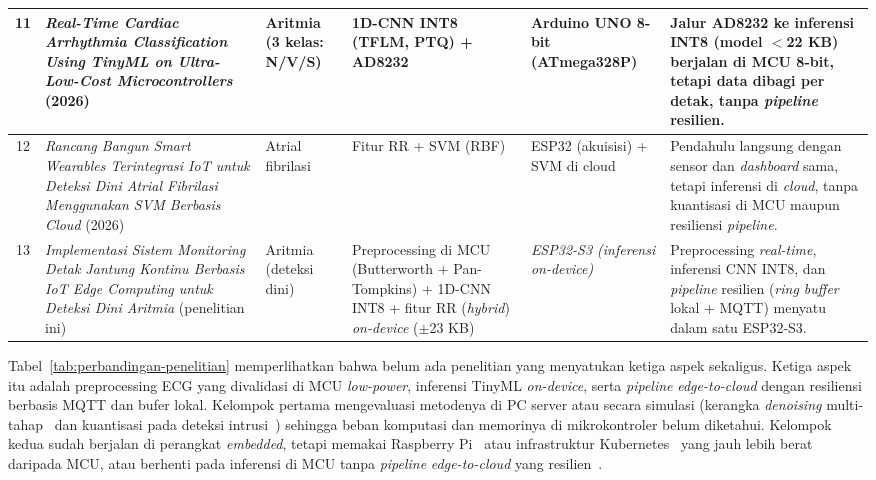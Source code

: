 {\begin{longtable}{|c|L{3.5cm}|L{2.0cm}|L{2.0cm}|L{1.8cm}|L{2.8cm}|}
11 & \textit{Real-Time Cardiac Arrhythmia Classification Using TinyML on Ultra-Low-Cost Microcontrollers} (2026) & Aritmia (3 kelas: N/V/S) & 1D-CNN INT8 (TFLM, PTQ) + AD8232 & Arduino UNO 8-bit (ATmega328P) & Jalur AD8232 ke inferensi INT8 (model $<$22 KB) berjalan di MCU 8-bit, tetapi data dibagi per detak, tanpa \textit{pipeline} resilien. \\ \hline

12 & \textit{Rancang Bangun Smart Wearables Terintegrasi IoT untuk Deteksi Dini Atrial Fibrilasi Menggunakan SVM Berbasis Cloud} (2026) & Atrial fibrilasi & Fitur RR + SVM (RBF) & ESP32 (akuisisi) + SVM di cloud & Pendahulu langsung dengan sensor dan \textit{dashboard} sama, tetapi inferensi di \textit{cloud}, tanpa kuantisasi di MCU maupun resiliensi \textit{pipeline}. \\ \hline

13 & \textit{Implementasi Sistem Monitoring Detak Jantung Kontinu Berbasis IoT Edge Computing untuk Deteksi Dini Aritmia} (penelitian ini) & Aritmia (deteksi dini) & Preprocessing di MCU (Butterworth + Pan-Tompkins) + 1D-CNN INT8 + fitur RR (\textit{hybrid}) \textit{on-device} ($\pm$23 KB) & \textit{ESP32-S3 (inferensi on-device)} & Preprocessing \textit{real-time}, inferensi CNN INT8, dan \textit{pipeline} resilien (\textit{ring buffer} lokal + MQTT) menyatu dalam satu ESP32-S3. \\ \hline

\end{longtable}
}

Tabel~\ref{tab:perbandingan-penelitian} memperlihatkan bahwa belum ada penelitian yang menyatukan ketiga aspek sekaligus. Ketiga aspek itu adalah preprocessing ECG yang divalidasi di MCU \textit{low-power}, inferensi TinyML \textit{on-device}, serta \textit{pipeline} \textit{edge-to-cloud} dengan resiliensi berbasis MQTT dan bufer lokal. Kelompok pertama mengevaluasi metodenya di PC server atau secara simulasi (kerangka \textit{denoising} multi-tahap~\cite{xie_2021} dan kuantisasi pada deteksi intrusi~\cite{laiu_2026}) sehingga beban komputasi dan memorinya di mikrokontroler belum diketahui. Kelompok kedua sudah berjalan di perangkat \textit{embedded}, tetapi memakai Raspberry Pi~\cite{karri_2023} atau infrastruktur Kubernetes~\cite{resilient_edge_cloud} yang jauh lebih berat daripada MCU, atau berhenti pada inferensi di MCU tanpa \textit{pipeline} \textit{edge-to-cloud} yang resilien~\cite{kim_2023}.

